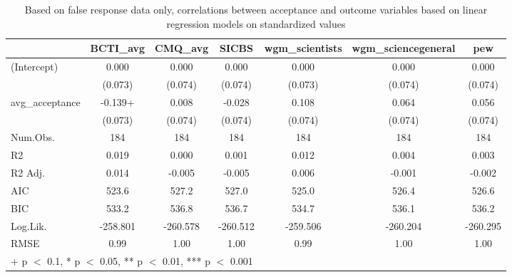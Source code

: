 \documentclass[
  doc,floatsintext]{apa6}
\begin{document}
\begin{table}

\caption{\label{tab:false-response-regression}Based on false response data only, correlations between acceptance and outcome variables based on linear regression models on standardized values}
\centering
\begin{tabular}[t]{lcccccc}
\toprule
  & BCTI\_avg & CMQ\_avg & SICBS & wgm\_scientists & wgm\_sciencegeneral & pew\\
\midrule
(Intercept) & 0.000 & 0.000 & 0.000 & 0.000 & 0.000 & 0.000\\
 & (0.073) & (0.074) & (0.074) & (0.073) & (0.074) & (0.074)\\
avg\_acceptance & -0.139+ & 0.008 & -0.028 & 0.108 & 0.064 & 0.056\\
 & (0.073) & (0.074) & (0.074) & (0.074) & (0.074) & (0.074)\\
\midrule
Num.Obs. & 184 & 184 & 184 & 184 & 184 & 184\\
R2 & 0.019 & 0.000 & 0.001 & 0.012 & 0.004 & 0.003\\
R2 Adj. & 0.014 & -0.005 & -0.005 & 0.006 & -0.001 & -0.002\\
AIC & 523.6 & 527.2 & 527.0 & 525.0 & 526.4 & 526.6\\
BIC & 533.2 & 536.8 & 536.7 & 534.7 & 536.1 & 536.2\\
Log.Lik. & -258.801 & -260.578 & -260.512 & -259.506 & -260.204 & -260.295\\
RMSE & 0.99 & 1.00 & 1.00 & 0.99 & 1.00 & 1.00\\
\bottomrule
\multicolumn{7}{l}{\rule{0pt}{1em}+ p $<$ 0.1, * p $<$ 0.05, ** p $<$ 0.01, *** p $<$ 0.001}\\
\end{tabular}
\end{table}
\end{document}
